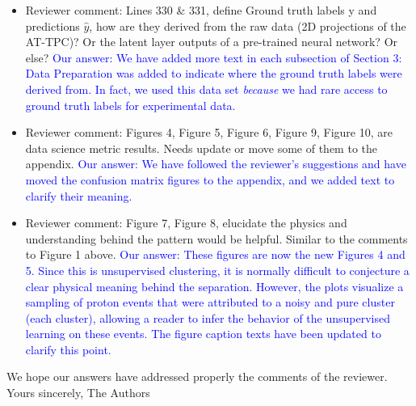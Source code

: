 \documentclass[12pt]{article}
\begin{document}
\begin{itemize}
\item Reviewer comment: Lines 330 \& 331, define Ground truth labels y and predictions $\hat{y}$, how are they derived from
the raw data (2D projections of the AT-TPC)? Or the latent layer outputs of a pre-trained neural
network? Or else?
\textcolor{blue}{Our answer: We have added more text in each subsection of Section 3: Data Preparation was added to indicate where the ground truth labels were derived from. In fact, we used this data set {\it because} we had rare access to ground truth labels for experimental data.}
\item Reviewer comment: Figures 4, Figure 5, Figure 6, Figure 9, Figure 10, are data science metric results. Needs update or
move some of them to the appendix.
\textcolor{blue}{Our answer: We have followed the reviewer's suggestions and have moved the confusion matrix figures to the appendix, and we added text to clarify their meaning.}
\item Reviewer comment: Figure 7, Figure 8, elucidate the physics and understanding behind the pattern would be helpful.
Similar to the comments to Figure 1 above.
\textcolor{blue}{Our answer: These figures are now the new Figures 4 and 5. Since this is unsupervised clustering, it is normally difficult to  conjecture a clear   physical meaning behind the separation. However, the plots visualize a sampling of proton events that were attributed to a noisy and pure cluster (each cluster), allowing a reader to infer the behavior of the unsupervised learning on these events. The figure caption texts have been updated to clarify this point. }
\end{itemize}

We hope our answers have addressed properly the comments of the reviewer. \newline
Yours sincerely,\newline
The Authors
\end{document}
